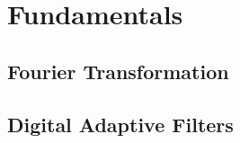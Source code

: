 \chapter{Fundamentals}
\label{chap:fundamentals}

\section{Fourier Transformation}

\section{Digital Adaptive Filters}

